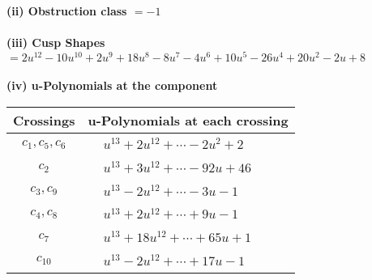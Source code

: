 \documentclass[1p]{elsarticle_modified}
\theoremstyle{definition}
\begin{document}
\flushleft \textbf{(ii) Obstruction class $= -1$}\\~\\
\flushleft \textbf{(iii) Cusp Shapes $= 2 u^{12}-10 u^{10}+2 u^9+18 u^8-8 u^7-4 u^6+10 u^5-26 u^4+20 u^2-2 u+8$}\\~\\
\newpage\renewcommand{\arraystretch}{1}
\flushleft \textbf{(iv) u-Polynomials at the component}\newline \\
\begin{tabular}{m{50pt}|m{274pt}}
Crossings & \hspace{64pt}u-Polynomials at each crossing \\
\hline $$\begin{aligned}c_{1},c_{5},c_{6}\end{aligned}$$&$\begin{aligned}
&u^{13}+2 u^{12}+\cdots-2 u^2+2
\end{aligned}$\\
\hline $$\begin{aligned}c_{2}\end{aligned}$$&$\begin{aligned}
&u^{13}+3 u^{12}+\cdots-92 u+46
\end{aligned}$\\
\hline $$\begin{aligned}c_{3},c_{9}\end{aligned}$$&$\begin{aligned}
&u^{13}-2 u^{12}+\cdots-3 u-1
\end{aligned}$\\
\hline $$\begin{aligned}c_{4},c_{8}\end{aligned}$$&$\begin{aligned}
&u^{13}+2 u^{12}+\cdots+9 u-1
\end{aligned}$\\
\hline $$\begin{aligned}c_{7}\end{aligned}$$&$\begin{aligned}
&u^{13}+18 u^{12}+\cdots+65 u+1
\end{aligned}$\\
\hline $$\begin{aligned}c_{10}\end{aligned}$$&$\begin{aligned}
&u^{13}-2 u^{12}+\cdots+17 u-1
\end{aligned}$\\
\hline
\end{tabular}\\~\\
\end{document}
